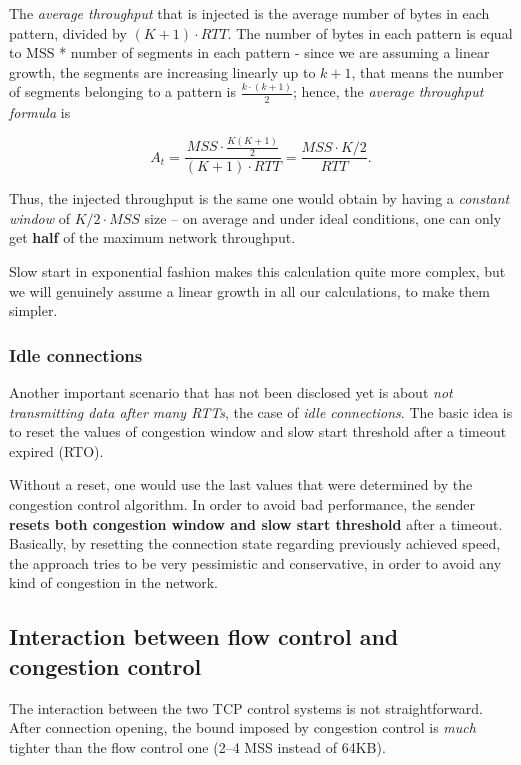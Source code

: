 \documentclass[10pt]{extreport}
\begin{document}
The \emph{average throughput} that is injected is the average number of bytes in each
pattern, divided by $(K + 1)\cdot RTT$. The number of bytes in each pattern is
equal to MSS * number of segments in each pattern \-- since we are assuming a
linear growth, the segments are increasing linearly up to $k+1$, that means the
number of segments belonging to a pattern is $\frac{k \cdot (k + 1)}{2}$;
hence, the \emph{average throughput formula} is

$$A_t = \frac{MSS\cdot \frac{K(K+1)}{2}}{(K+1)\cdot RTT} = \frac{MSS\cdot
K/2}{RTT}.$$ 

Thus, the injected throughput is the same one would obtain by
having a \emph{constant window} of $K/2 \cdot MSS$ size \--- on average and
under ideal conditions, one can only get \textbf{half} of the maximum network
throughput.

Slow start in exponential fashion makes this calculation quite more complex,
but we will genuinely assume a linear growth in all our calculations, to make
them simpler.

\subsubsection{Idle connections}

Another important scenario that has not been disclosed yet is about \emph{not
transmitting data after many RTTs}, the case of \emph{idle connections}. The
basic idea is to reset the values of congestion window and slow start threshold
after a timeout expired (RTO).

Without a reset, one would use the last values that were determined by the
congestion control algorithm. In order to avoid bad performance, the sender
\textbf{resets both congestion window and slow start threshold} after a
timeout. Basically, by resetting the connection state regarding previously
achieved speed, the approach tries to be very pessimistic and conservative, in
order to avoid any kind of congestion in the network.

\subsection{Interaction between flow control and congestion control}

The interaction between the two TCP control systems is not straightforward.
After connection opening, the bound imposed by congestion control is
\emph{much} tighter than the flow control one (2--4 MSS instead of 64KB).
\end{document}
